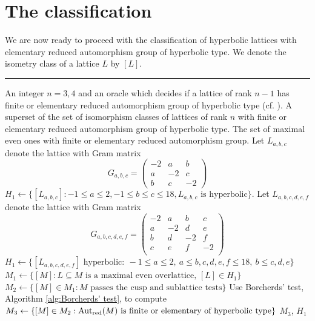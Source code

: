 \documentclass[11pt,letterpaper]{amsart}
\DeclareMathOperator{\Aut}{Aut}
\newcommand{\AutredM}{\Aut_{\rm red}(M)}
\theoremstyle{definition}
\theoremstyle{remark}
\begin{document}
\section{The classification} \label{sec:classification}
We are now ready to proceed with the classification of hyperbolic lattices with elementary reduced automorphism group of hyperbolic type.
We denote the isometry class of a lattice $L$ by $[L]$.
\begingroup
{}\label{alg:maximal}
\endgroup
\hrule
\begin{algorithmic}[1]
\REQUIRE An integer $n=3,4$ and an oracle which decides if a lattice of rank $n-1$ has finite or elementary reduced automorphism group of hyperbolic type (cf. ). 
\ENSURE 
A superset of the set of isomorphism classes of lattices of rank $n$ with finite or elementary reduced automorphism group of hyperbolic type. The set of maximal even ones with finite or elementary reduced automorphism group. 
\STATE Let $L_{a,b,c}$ denote the lattice with Gram matrix 
\[G_{a,b,c}=\begin{pmatrix}
    -2 &a &b\\
    a  &-2 &c\\
    b  &c & -2
\end{pmatrix}\]
$H_1 \gets \{ [L_{a,b,c}] : -1 \leq a \leq 2, -1 \leq b \leq c \leq 18, L_{a,b,c} \text{ is hyperbolic} \}.$ \label{alg: def H1 rk 3}
\ENDIF
{}
\STATE Let $L_{a,b,c,d,e,f}$ denote the lattice with Gram matrix 
\[G_{a,b,c,d,e,f}=\begin{pmatrix}
    -2 & a &  b &  c\\
    a  &-2 &  d &  e\\
    b  & d & -2 &  f\\
    c  & e &  f & -2\\
\end{pmatrix}\]
\STATE $H_1 \gets \{ [L_{a,b,c,d,e,f}] \text{ hyperbolic}: \  -1 \leq a \leq 2, \ a \leq b,c,d,e,f \leq 18, \ b\leq c, d, e \}$ \label{alg: def H1 rk 4}
\ENDIF
\STATE $M_1 \gets \{[M] : L \subseteq M \text{ is a maximal even overlattice, } [L] \in H_1\}$ \label{alg:def M1}
\STATE $M_2 \gets \{[M] \in M_1 : M \text{ passes the cusp and sublattice tests} \}$ \label{alg:def M2}
\STATE Use Borcherds' test, Algorithm \ref{alg:Borcherds' test}, to compute \\
$M_3 \gets \{[M] \in M_2 : \AutredM\mbox{ is finite or elementary of hyperbolic type}\}$ 
\RETURN $M_3$, $H_1$
\end{algorithmic}\hrulefill\\
\end{document}
